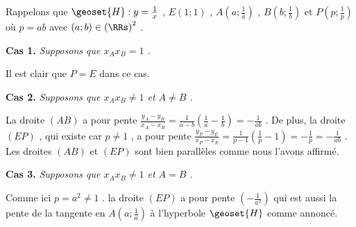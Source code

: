Rappelons que $\geoset{H} : y = \frac{1}{x}$ , $E(1 ; 1)$ , $A \left( a ; \frac{1}{a} \right)$ , $B \left( b ; \frac{1}{b} \right)$ et $P \left( p ; \frac{1}{p} \right)$ où $p = a b$ avec $(a ; b) \in \left( \RRs \right)^2$ .



\bigskip

\textbf{Cas 1.} \emph{Supposons que $x_A x_B = 1$ .}

\medskip

Il est clair que $P = E$ dans ce cas.



\bigskip

\textbf{Cas 2.} \emph{Supposons que $x_A x_B \neq 1$ et $A \neq B$ .}

\medskip

La droite $(AB)$ a pour pente
$\frac{y_A - y_B}{x_A - x_B} = \frac{1}{a - b} \left( \frac{1}{a} - \frac{1}{b} \right) = - \frac{1}{ab}$ .
De plus, la droite $(EP)$ , qui existe car $p \neq 1$ , a pour pente
$\frac{y_P - y_E}{x_P - x_E} = \frac{1}{p - 1} \left( \frac{1}{p} - 1 \right) = - \frac{1}{p} = - \frac{1}{ab}$ .
Les droites $(AB)$ et $(EP)$ sont bien parallèles comme nous l'avons affirmé.



\bigskip

\textbf{Cas 3.} \emph{Supposons que $x_A x_B \neq 1$ et $A = B$ .}

\medskip

Comme ici $p = a^2 \neq 1$ . la droite $(EP)$ a pour pente $\left( - \frac{1}{a^2} \right)$ qui est aussi la pente de la tangente en $A \left( a ; \frac{1}{a} \right)$ à l'hyperbole $\geoset{H}$ comme annoncé. 